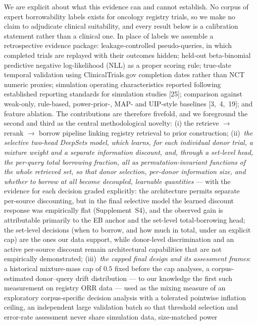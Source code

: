 \documentclass[11pt]{article}
\begin{document}
We are explicit about what this evidence can and cannot establish. No corpus of
expert borrowability labels exists for oncology registry trials, so we make no
claim to adjudicate clinical suitability, and every result below is a
calibration statement rather than a clinical one. In place of labels we assemble
a retrospective evidence package: leakage-controlled pseudo-queries, in which
completed trials are replayed with their outcomes hidden; held-out beta-binomial
predictive negative log-likelihood (NLL) as a proper scoring rule; true-date
temporal validation using ClinicalTrials.gov completion dates rather than NCT
numeric proxies; simulation operating characteristics reported following
established reporting standards for simulation studies [25]; comparison against
weak-only, rule-based, power-prior-, MAP- and UIP-style baselines
[3,~4,~19]; and feature ablation. The contributions
are therefore fivefold, and we foreground the second and third as the central
methodological novelty: (i) the retrieve $\rightarrow$ rerank $\rightarrow$
borrow pipeline linking registry retrieval to prior construction;
(ii)~\emph{the selective two-head DeepSets model, which learns, for each
individual donor trial, a mixture weight
and a separate information discount, and, through a set-level head, the
per-query total borrowing fraction, all as permutation-invariant functions of
the whole retrieved set, so that donor selection, per-donor information size,
and whether to borrow at all become decoupled, learnable quantities} --- with
the evidence for each decision graded explicitly: the architecture
permits separate per-source discounting, but in the final selective model
the learned discount response was empirically flat (Supplement~S4), and
the observed gain is attributable primarily to the EB anchor and the
set-level total-borrowing head; the set-level decisions
(when to borrow, and how much in total, under an explicit cap) are the ones
our data support, while donor-level discrimination and an active
per-source discount remain architectural
capabilities that are not empirically demonstrated;
(iii)~\emph{the capped final design and its assessment frames}: a
historical mixture-mass cap of $0.5$ fixed before the cap analyses, a
corpus-estimated donor--query
drift distribution --- to our knowledge the first such measurement on
registry ORR data --- used as the mixing measure of an exploratory
corpus-specific decision analysis with a tolerated pointwise inflation
ceiling, an
independent large validation batch so that threshold selection and
error-rate assessment never share simulation data, size-matched power
\end{document}
